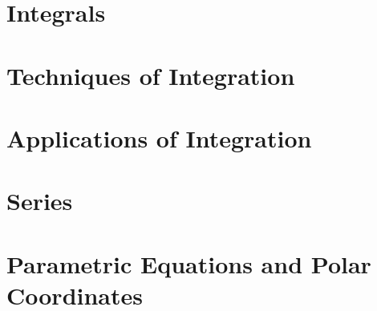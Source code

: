 \documentclass[12pt]{article}
\begin{document}
\section{Integrals}






\section{Techniques of Integration}







\section{Applications of Integration}






\section{Series}










\section{Parametric Equations and Polar Coordinates}






\end{document}

